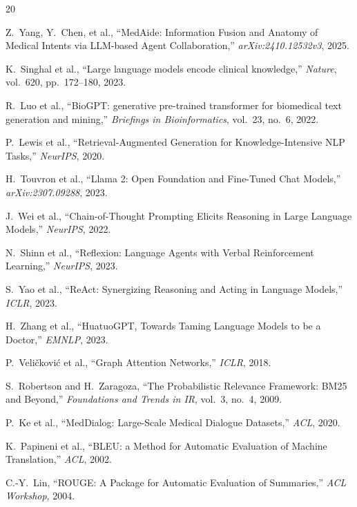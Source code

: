 \documentclass[conference]{IEEEtran}
\begin{document}
\begin{thebibliography}{20}

Z.~Yang, Y.~Chen, et al., ``MedAide: Information Fusion and Anatomy of Medical Intents via LLM-based Agent Collaboration,'' \textit{arXiv:2410.12532v3}, 2025.

K.~Singhal et al., ``Large language models encode clinical knowledge,'' \textit{Nature}, vol.~620, pp.~172--180, 2023.

R.~Luo et al., ``BioGPT: generative pre-trained transformer for biomedical text generation and mining,'' \textit{Briefings in Bioinformatics}, vol.~23, no.~6, 2022.

P.~Lewis et al., ``Retrieval-Augmented Generation for Knowledge-Intensive NLP Tasks,'' \textit{NeurIPS}, 2020.

H.~Touvron et al., ``Llama 2: Open Foundation and Fine-Tuned Chat Models,'' \textit{arXiv:2307.09288}, 2023.

J.~Wei et al., ``Chain-of-Thought Prompting Elicits Reasoning in Large Language Models,'' \textit{NeurIPS}, 2022.

N.~Shinn et al., ``Reflexion: Language Agents with Verbal Reinforcement Learning,'' \textit{NeurIPS}, 2023.

S.~Yao et al., ``ReAct: Synergizing Reasoning and Acting in Language Models,'' \textit{ICLR}, 2023.

H.~Zhang et al., ``HuatuoGPT, Towards Taming Language Models to be a Doctor,'' \textit{EMNLP}, 2023.

P.~Veli\v{c}kovi\'{c} et al., ``Graph Attention Networks,'' \textit{ICLR}, 2018.

S.~Robertson and H.~Zaragoza, ``The Probabilistic Relevance Framework: BM25 and Beyond,'' \textit{Foundations and Trends in IR}, vol.~3, no.~4, 2009.

P.~Ke et al., ``MedDialog: Large-Scale Medical Dialogue Datasets,'' \textit{ACL}, 2020.

K.~Papineni et al., ``BLEU: a Method for Automatic Evaluation of Machine Translation,'' \textit{ACL}, 2002.

C.-Y.~Lin, ``ROUGE: A Package for Automatic Evaluation of Summaries,'' \textit{ACL Workshop}, 2004.


\end{thebibliography}
\end{document}
